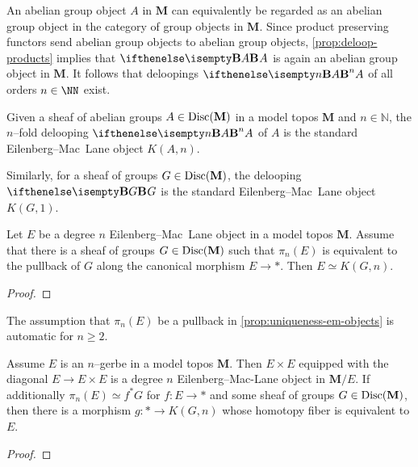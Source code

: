 An abelian group object \(A\) in \(\mathbf M\) can equivalently be regarded as
an abelian group object in the category of group objects in \(\mathbf M\). Since
product preserving functors send abelian group objects to abelian group objects,
\autoref{prop:deloop-products} implies that \(\deloop{A}\) is again an abelian
group object in \(\mathbf M\). It follows that deloopings \(\deloop[n]{A}\) of
all orders \(n\in\NN\) exist.

\begin{definition}
  Given a sheaf of abelian groups \(A\in\operatorname{\textnormal{Disc}}(\mathbf M)\) in a model topos
  \(\mathbf M\) and \(n\in\mathbb N\), the \(n\)--fold delooping
  \(\deloop[n]{A}\) of \(A\) is the standard Eilenberg--Mac~Lane object \(K(A,n)\).

  Similarly, for a sheaf of groups \(G\in\operatorname{\textnormal{Disc}}(\mathbf M)\), the delooping
  \(\deloop{G}\) is the standard Eilenberg--Mac~Lane object \(K(G,1)\).
\end{definition}

\begin{proposition}\label{prop:uniqueness-em-objects}
  Let \(E\) be a degree \(n\) Eilenberg--Mac~Lane object in a model topos \(\mathbf M\).
  Assume that there is a sheaf of groups \(G\in\operatorname{\textnormal{Disc}}(\mathbf M)\) such that
  \(\pi_n(E)\) is equivalent to the pullback of \(G\) along the canonical morphism
  \(E\to *\). Then \(E\simeq K(G,n)\).
\end{proposition}
\begin{proof}
\end{proof}
\begin{remark}
  The assumption that \(\pi_n(E)\) be a pullback in
  \autoref{prop:uniqueness-em-objects} is automatic for \(n\geq
  2\).
\end{remark}

\begin{proposition}\label{prop:gerbe-classification}
  Assume \(E\) is an \(n\)--gerbe in a model topos \(\mathbf M\). Then \(E\times
  E\) equipped with the diagonal \(E\to E\times E\) is a degree \(n\)
  Eilenberg--Mac-Lane object in \(\mathbf M/E\). If additionally \(\pi_n(E)
  \simeq f^*G\) for \(f\colon E\to *\) and some sheaf of groups
  \(G\in\operatorname{\textnormal{Disc}}(\mathbf M)\), then there is a morphism \(g\colon * \to K(G,n)\)
  whose homotopy fiber is equivalent to \(E\).
\end{proposition}
\begin{proof}
\end{proof}

